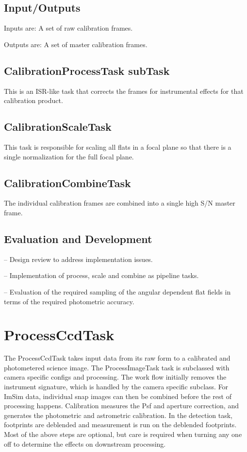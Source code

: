 \documentclass[prd, nofootinbib, floatfix, 11pt,tightenlines,times]{article}
\begin{document}
\subsection{Input/Outputs}
Inputs are: A set of raw calibration frames.

Outputs are: A set of master calibration frames.

\subsection{CalibrationProcessTask subTask}
This is an ISR-like task that corrects the frames for instrumental effects for that calibration
product.

\subsection{CalibrationScaleTask}
This task is responsible for
scaling all flats in a focal plane so that there is a single normalization for the full focal plane.

\subsection{CalibrationCombineTask}
The individual calibration frames are combined into a single high S/N master frame. 

\subsection{Evaluation and Development}

-- Design review to address implementation issues.

-- Implementation of process, scale and combine as pipeline tasks.

-- Evaluation of the required sampling of the angular dependent flat
fields in terms of the required photometric accuracy.



\section{ProcessCcdTask\label{processccdsec}} 
The ProcessCcdTask takes input data from its raw form to a calibrated
and photometered science image. The ProcessImageTask task is
subclassed with camera specific configs and processing. The work flow
initially removes the instrument signature, which is handled by the
camera specific subclass.  For ImSim data, individual snap images can
then be combined before the rest of processing happens. Calibration
measures the Psf and aperture correction, and generates the
photometric and astrometric calibration.  In the detection task,
footprints are deblended and measurement is run on the deblended
footprints.  Most of the above steps are optional, but care is
required when turning any one off to determine the effects on downstream processing.
\end{document}
